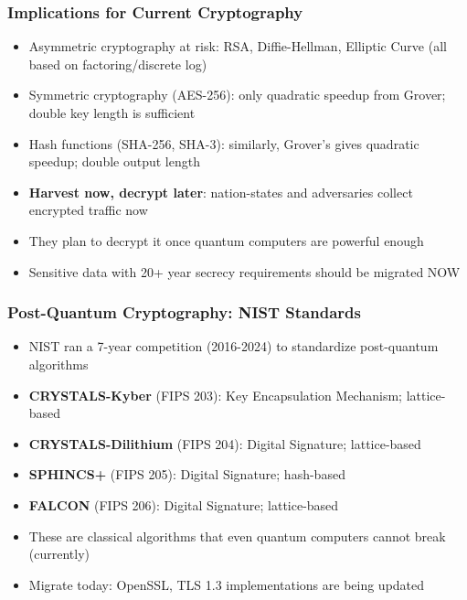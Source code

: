 \begin{frame}[fragile]\frametitle{Implications for Current Cryptography}
\begin{itemize}
\item Asymmetric cryptography at risk: RSA, Diffie-Hellman, Elliptic Curve (all based on factoring/discrete log)
\item Symmetric cryptography (AES-256): only quadratic speedup from Grover; double key length is sufficient
\item Hash functions (SHA-256, SHA-3): similarly, Grover's gives quadratic speedup; double output length
\item \textbf{Harvest now, decrypt later}: nation-states and adversaries collect encrypted traffic now
\item They plan to decrypt it once quantum computers are powerful enough
\item Sensitive data with 20+ year secrecy requirements should be migrated NOW
\end{itemize}
\end{frame}

\begin{frame}[fragile]\frametitle{Post-Quantum Cryptography: NIST Standards}
\begin{itemize}
\item NIST ran a 7-year competition (2016-2024) to standardize post-quantum algorithms
\item \textbf{CRYSTALS-Kyber} (FIPS 203): Key Encapsulation Mechanism; lattice-based
\item \textbf{CRYSTALS-Dilithium} (FIPS 204): Digital Signature; lattice-based
\item \textbf{SPHINCS+} (FIPS 205): Digital Signature; hash-based
\item \textbf{FALCON} (FIPS 206): Digital Signature; lattice-based
\item These are classical algorithms that even quantum computers cannot break (currently)
\item Migrate today: OpenSSL, TLS 1.3 implementations are being updated
\end{itemize}
\end{frame}


